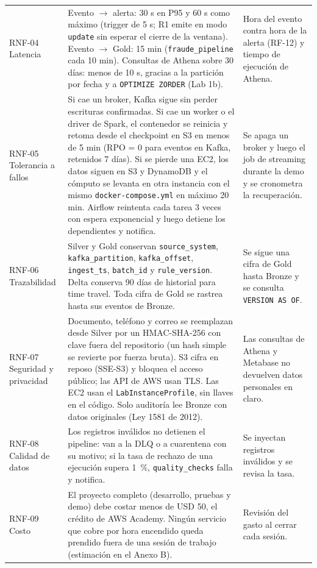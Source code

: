 \documentclass[12pt,letterpaper]{article}
\newcommand{\code}[1]{{\small\texttt{#1}}}
\begin{document}
\begin{footnotesize}
\begin{longtable}{@{}P{0.8in}P{3.95in}P{1.7in}@{}}
RNF-04 Latencia & Evento $\rightarrow$ alerta: 30 s en P95 y 60 s como máximo (trigger de 5 s; R1 emite en modo \code{update} sin esperar el cierre de la ventana). Evento $\rightarrow$ Gold: 15 min (\code{fraude\_pipeline} cada 10 min). Consultas de Athena sobre 30 días: menos de 10 s, gracias a la partición por fecha y a \code{OPTIMIZE ZORDER} (Lab 1b). & Hora del evento contra hora de la alerta (RF-12) y tiempo de ejecución de Athena.\\[1pt]
RNF-05 Tolerancia a fallos & Si cae un broker, Kafka sigue sin perder escrituras confirmadas. Si cae un worker o el driver de Spark, el contenedor se reinicia y retoma desde el checkpoint en S3 en menos de 5 min (RPO = 0 para eventos en Kafka, retenidos 7 días). Si se pierde una EC2, los datos siguen en S3 y DynamoDB y el cómputo se levanta en otra instancia con el mismo \code{docker-compose.yml} en máximo 20 min. Airflow reintenta cada tarea 3 veces con espera exponencial y luego detiene los dependientes y notifica. & Se apaga un broker y luego el job de streaming durante la demo y se cronometra la recuperación.\\[1pt]
RNF-06 Trazabilidad & Silver y Gold conservan \code{source\_system}, \code{kafka\_partition}, \code{kafka\_offset}, \code{ingest\_ts}, \code{batch\_id} y \code{rule\_version}. Delta conserva 90 días de historial para time travel. Toda cifra de Gold se rastrea hasta sus eventos de Bronze. & Se sigue una cifra de Gold hasta Bronze y se consulta \code{VERSION AS OF}.\\[1pt]
RNF-07 Seguridad y privacidad & Documento, teléfono y correo se reemplazan desde Silver por un HMAC-SHA-256 con clave fuera del repositorio (un hash simple se revierte por fuerza bruta). S3 cifra en reposo (SSE-S3) y bloquea el acceso público; las API de AWS usan TLS. Las EC2 usan el \code{LabInstanceProfile}, sin llaves en el código. Solo auditoría lee Bronze con datos originales (Ley 1581 de 2012). & Las consultas de Athena y Metabase no devuelven datos personales en claro.\\[1pt]
RNF-08 Calidad de datos & Los registros inválidos no detienen el pipeline: van a la DLQ o a cuarentena con su motivo; si la tasa de rechazo de una ejecución supera 1~\%, \code{quality\_checks} falla y notifica. & Se inyectan registros inválidos y se revisa la tasa.\\[1pt]
RNF-09 Costo & El proyecto completo (desarrollo, pruebas y demo) debe costar menos de USD 50, el crédito de AWS Academy. Ningún servicio que cobre por hora encendido queda prendido fuera de una sesión de trabajo (estimación en el Anexo B). & Revisión del gasto al cerrar cada sesión.\\
\end{longtable}
\end{footnotesize}
\end{document}
